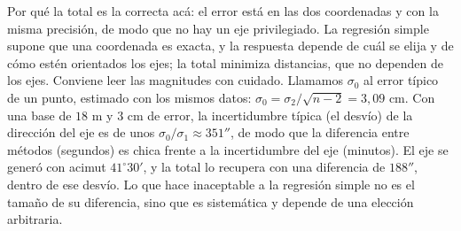 Por qué la total es la correcta acá: el error está en las dos coordenadas y con la misma
precisión, de modo que no hay un eje privilegiado. La regresión simple supone que una
coordenada es exacta, y la respuesta depende de cuál se elija y de cómo estén orientados los
ejes; la total minimiza distancias, que no dependen de los ejes. Conviene leer las magnitudes con
cuidado. Llamamos \(\sigma_0\) al error típico de un punto, estimado con los mismos datos:
\(\sigma_0=\sigma_2/\sqrt{n-2}=3{,}09\) cm. Con una base de \(18\) m y \(3\) cm de error, la
incertidumbre típica (el desvío) de la dirección del eje es de unos
\(\sigma_0/\sigma_1\approx351''\), de modo que
la diferencia entre métodos (segundos) es chica frente a la incertidumbre del eje (minutos).
El eje se generó con acimut \(41^\circ30'\), y la total lo recupera con una diferencia de
\(188''\), dentro de ese desvío. Lo que hace inaceptable a la regresión simple no es el
tamaño de su diferencia, sino que es sistemática y depende de una elección arbitraria.

